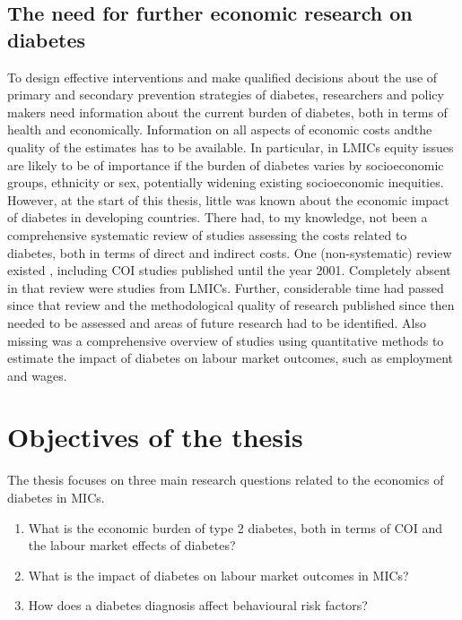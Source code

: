 \subsection{The need for further economic research on diabetes}

To design effective interventions and \DIFaddbegin {}\DIFaddend make qualified decisions about the use of primary and secondary prevention strategies of diabetes, researchers and policy makers need information about the current burden of diabetes, both in terms of health and economically. Information on all aspects of economic costs and\DIFaddbegin {}\DIFaddend the quality of the estimates has to be available\DIFdelbegin {}\DIFdelend . In particular, in \acp{LMIC} equity issues are likely to be of importance if the burden of diabetes varies by socioeconomic groups, ethnicity or sex, potentially widening existing socioeconomic inequities. However, at the start of this thesis, little was known about the economic impact of diabetes in developing countries. There had, to my knowledge, not been a comprehensive systematic review of studies assessing the costs related to diabetes, both in terms of direct and indirect costs. One (non-systematic) review existed \parencite{Ettaro2004}, including \ac{COI} studies published until the year 2001. Completely absent in that review were studies from \acp{LMIC}. Further, considerable time had passed since that review and the methodological quality of research published since then needed to be assessed and areas of future research had to be identified. Also missing was a comprehensive overview of studies using quantitative methods to estimate the impact of diabetes on labour market outcomes, such as employment and wages.



\section{Objectives of the thesis}

The thesis focuses on three main research questions related to the economics of diabetes in \acp{MIC}. 

\begin{enumerate}
\item What is the \DIFdelbegin {}\DIFdelend \DIFaddbegin {}\DIFaddend economic burden of type 2 diabetes, both in terms of \ac{COI} and the labour market effects of diabetes? 

\item What is the impact of diabetes on labour market outcomes in \acp{MIC}?

\item How does a diabetes diagnosis affect behavioural risk factors?

\end{enumerate}

